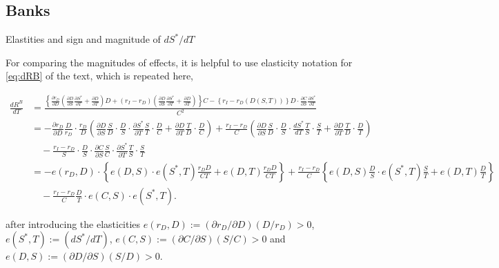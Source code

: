 \subsection{Banks}
\label{sec:banks}
Elastities and sign and magnitude of $dS^*/dT$

For comparing the magnitudes of effects, it is helpful to use elasticity notation for \autoref{eq:dRB} of the text, which is repeated here,

\scriptsize
\begin{align}
\frac{dR^B}{dT} &= 
\frac{\left\{
    \frac{\partial r_D}{\partial D}
    \left( 
        \frac{\partial D}{\partial S} \frac{\partial S^*}{\partial T} 
        + \frac{\partial D}{\partial T} 
    \right)D
    + (r_I - r_D)
    \left(
        \frac{\partial D}{\partial S} \frac{\partial S^*}{\partial T} 
        + \frac{\partial D}{\partial T}
    \right)
\right\} C - \left\{ r_I - r_D(D(S, T)) \right\} D \cdot \frac{\partial C}{\partial S} \frac{\partial S^*}{\partial T}}{C^2} \nonumber \\
&= - \frac{\partial r_D}{\partial D}\frac{D}{r_D}\cdot \frac{r_D}{D}
    \left( 
        \frac{\partial D}{\partial S} \frac{S}{D}\cdot \frac{D}{S} \cdot \frac{\partial S^*}{\partial T}\frac{S}{T}\cdot \frac{D}{C}
        + \frac{\partial D}{\partial T} \frac{T}{D}\cdot \frac{D}{C}
    \right) 
    + \frac{r_I - r_D}{C} 
    \left( 
        \frac{\partial D}{\partial S}\frac{S}{D} \cdot \frac{D}{S}\cdot \frac{d S^*}{dT}\frac{T}{S}\cdot \frac{S}{T} 
        + \frac{\partial D}{\partial T}\frac{T}{D}\cdot \frac{D}{T}
    \right) \nonumber \\
&\quad - \frac{r_I - r_D}{S} \cdot \frac{D}{S} \cdot \frac{\partial C}{\partial S} \frac{S}{C} \cdot \frac{\partial S^*}{\partial T}\frac{T}{S} \cdot \frac{S}{T}\nonumber \\
&= - e(r_D, D) \cdot \left\{ 
        e(D, S) \cdot e(S^*, T) \frac{r_D D}{CT} 
        + e(D, T) \frac{r_D D}{CT} 
    \right\} + \frac{r_I - r_D}{C}
    \left\{
        e(D, S) \frac{D}{S} \cdot e(S^*, T) \frac{S}{T} 
        + e(D, T) \frac{D}{T}
    \right\} \nonumber \\
&\quad - \frac{r_I - r_D}{C} \frac{D}{T} \cdot e(C, S) \cdot e(S^*, T). \label{eq:A_dRB}
\end{align}
\normalsize

\noindent after introducing the elasticities $e(r_D,D):=(\partial r_D / \partial D)(D/r_D)>0$, $e(S^*,T):=(dS^*/dT)$, $e(C,S):=(\partial C/\partial S)(S/C)>0$ and $e(D,S):=(\partial D/\partial S)(S/D)>0$. 

